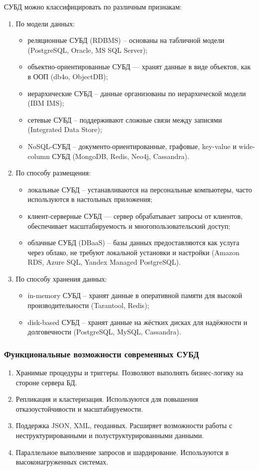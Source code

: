 СУБД можно классифицировать по различным признакам:
\begin{enumerate}
	\item По модели данных:
	\begin{itemize}
		\item реляционные СУБД (RDBMS) -- основаны на табличной модели (PostgreSQL, Oracle, MS SQL Server);
		\item объектно-ориентированные СУБД — хранят данные в виде объектов, как в ООП (db4o, ObjectDB);
		\item иерархические СУБД -- данные организованы по иерархической модели (IBM IMS);
		\item сетевые СУБД -- поддерживают сложные связи между записями (Integrated Data Store);
		\item NoSQL-СУБД -- документо-ориентированные, графовые, key-value и wide-column СУБД (MongoDB, Redis, Neo4j, Cassandra).
	\end{itemize}
	\item По способу размещения:
	\begin{itemize}
		\item локальные СУБД -- устанавливаются на персональные компьютеры, часто используются в настольных приложения;
		\item клиент-серверные СУБД — сервер обрабатывает запросы от клиентов, обеспечивает масштабируемость и многопользовательский доступ;
		\item облачные СУБД (DBaaS) -- базы данных предоставляются как услуга через облако, не требуют локальной установки и настройки (Amazon RDS, Azure SQL, Yandex Managed PostgreSQL).
	\end{itemize}
	\item По способу хранения данных:
	\begin{itemize}
		\item in-memory СУБД -- хранят данные в оперативной памяти для высокой производительности (Tarantool, Redis);
		\item disk-based СУБД -- хранят данные на жёстких дисках для надёжности и долговечности (PostgreSQL, MySQL, Cassandra).		
	\end{itemize}
\end{enumerate}

\subsubsection{Функциональные возможности современных СУБД}

\begin{enumerate}
	\item Хранимые процедуры и триггеры. Позволяют выполнять бизнес-логику на стороне сервера БД.
	\item Репликация и кластеризация. Используются для повышения отказоустойчивости и масштабируемости.
	\item Поддержка JSON, XML, геоданных. Расширяет возможности работы с неструктурированными и полуструктурированными данными.
	\item Параллельное выполнение запросов и шардирование. Используются в высоконагруженных системах.
\end{enumerate}

